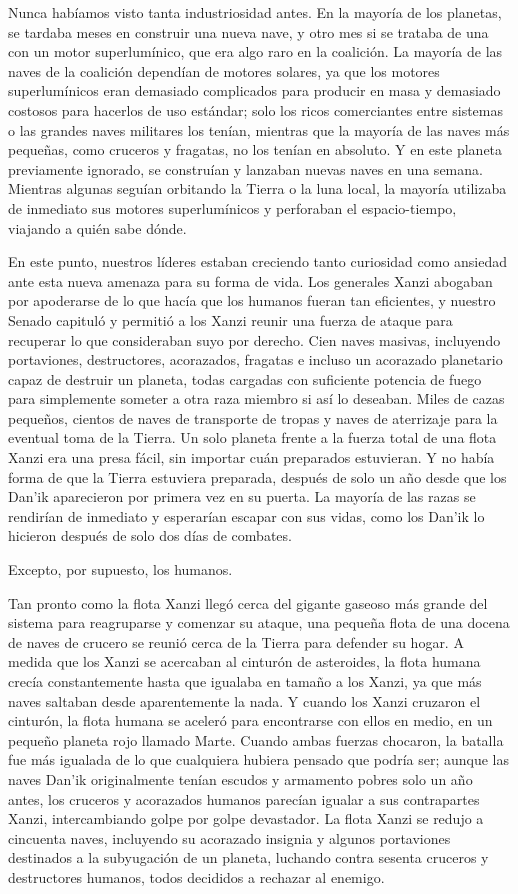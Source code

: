 \documentclass[spanish,12pt,a4paper, oneside]{book}
\begin{document}
    Nunca habíamos visto tanta industriosidad antes. En la mayoría de los planetas, se tardaba meses en construir una nueva nave, y otro mes si se trataba de una con un motor superlumínico, que era algo raro en la coalición. La mayoría de las naves de la coalición dependían de motores solares, ya que los motores superlumínicos eran demasiado complicados para producir en masa y demasiado costosos para hacerlos de uso estándar; solo los ricos comerciantes entre sistemas o las grandes naves militares los tenían, mientras que la mayoría de las naves más pequeñas, como cruceros y fragatas, no los tenían en absoluto. Y en este planeta previamente ignorado, se construían y lanzaban nuevas naves en una semana. Mientras algunas seguían orbitando la Tierra o la luna local, la mayoría utilizaba de inmediato sus motores superlumínicos y perforaban el espacio-tiempo, viajando a quién sabe dónde.

    En este punto, nuestros líderes estaban creciendo tanto curiosidad como ansiedad ante esta nueva amenaza para su forma de vida. Los generales Xanzi abogaban por apoderarse de lo que hacía que los humanos fueran tan eficientes, y nuestro Senado capituló y permitió a los Xanzi reunir una fuerza de ataque para recuperar lo que consideraban suyo por derecho. Cien naves masivas, incluyendo portaviones, destructores, acorazados, fragatas e incluso un acorazado planetario capaz de destruir un planeta, todas cargadas con suficiente potencia de fuego para simplemente someter a otra raza miembro si así lo deseaban. Miles de cazas pequeños, cientos de naves de transporte de tropas y naves de aterrizaje para la eventual toma de la Tierra. Un solo planeta frente a la fuerza total de una flota Xanzi era una presa fácil, sin importar cuán preparados estuvieran. Y no había forma de que la Tierra estuviera preparada, después de solo un año desde que los Dan'ik aparecieron por primera vez en su puerta. La mayoría de las razas se rendirían de inmediato y esperarían escapar con sus vidas, como los Dan'ik lo hicieron después de solo dos días de combates.

    Excepto, por supuesto, los humanos.

    Tan pronto como la flota Xanzi llegó cerca del gigante gaseoso más grande del sistema para reagruparse y comenzar su ataque, una pequeña flota de una docena de naves de crucero se reunió cerca de la Tierra para defender su hogar. A medida que los Xanzi se acercaban al cinturón de asteroides, la flota humana crecía constantemente hasta que igualaba en tamaño a los Xanzi, ya que más naves saltaban desde aparentemente la nada. Y cuando los Xanzi cruzaron el cinturón, la flota humana se aceleró para encontrarse con ellos en medio, en un pequeño planeta rojo llamado Marte. Cuando ambas fuerzas chocaron, la batalla fue más igualada de lo que cualquiera hubiera pensado que podría ser; aunque las naves Dan'ik originalmente tenían escudos y armamento pobres solo un año antes, los cruceros y acorazados humanos parecían igualar a sus contrapartes Xanzi, intercambiando golpe por golpe devastador. La flota Xanzi se redujo a cincuenta naves, incluyendo su acorazado insignia y algunos portaviones destinados a la subyugación de un planeta, luchando contra sesenta cruceros y destructores humanos, todos decididos a rechazar al enemigo.
\end{document}
